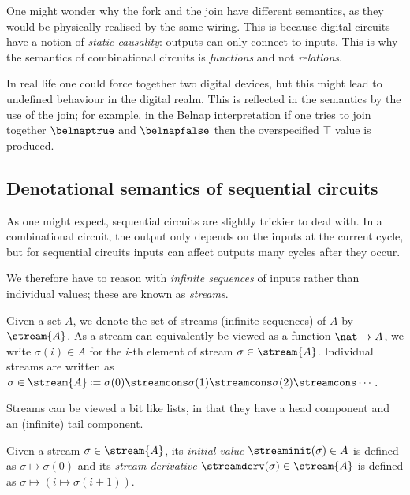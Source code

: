 \documentclass{lmcs}
\begin{document}
\begin{rem}
    One might wonder why the fork and the join have different semantics, as they
    would be physically realised by the same wiring.
    This is because digital circuits have a notion of \emph{static causality}:
    outputs can only connect to inputs.
    This is why the semantics of combinational circuits is \emph{functions} and
    not \emph{relations}.

    In real life one could force together two digital devices, but this might
    lead to undefined behaviour in the digital realm.
    This is reflected in the semantics by the use of the join; for example, in
    the Belnap interpretation if one tries to join together \(\belnaptrue\) and
    \(\belnapfalse\) then the overspecified \(\top\) value is produced.
\end{rem}

\subsection{Denotational semantics of sequential circuits}

As one might expect, sequential circuits are slightly trickier to deal with.
In a combinational circuit, the output only depends on the inputs at the current
cycle, but for sequential circuits inputs can affect outputs many cycles after
they occur.

We therefore have to reason with \emph{infinite sequences} of inputs rather than
individual values; these are known as \emph{streams}.

\begin{nota}
    Given a set \(A\), we denote the set of streams (infinite sequences) of
    \(A\) by \(\stream{A}\).
    As a stream can equivalently be viewed as a function \(\nat \to A\), we
    write \(\sigma(i) \in A\) for the \(i\)-th element of stream
    \(\sigma \in \stream{A}\).
    Individual streams are written as \(
    \sigma \in \stream{A}
    \coloneqq
    \sigma(0) \streamcons \sigma(1) \streamcons
    \sigma(2) \streamcons \cdots
    \).
\end{nota}

Streams can be viewed a bit like lists, in that they have a head component and
an (infinite) tail component.

\begin{defi}\label{def:stream-operations}
    Given a stream \(\sigma \in \stream{A}\), its \emph{initial value}
    \(\streaminit(\sigma) \in A\) is defined as \(\sigma \mapsto \sigma(0)\)
    and its \emph{stream derivative} \(\streamderv(\sigma) \in \stream{A}\) is
    defined as \(\sigma \mapsto (i \mapsto \sigma(i+1))\).
\end{defi}
\end{document}
